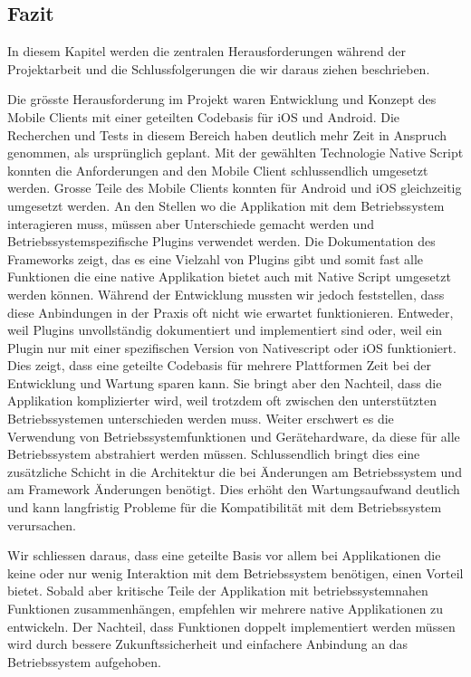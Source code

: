 \subsection{Fazit}

In diesem Kapitel werden die zentralen Herausforderungen während der Projektarbeit und die Schlussfolgerungen die wir daraus ziehen beschrieben.

Die grösste Herausforderung im Projekt waren Entwicklung und Konzept des Mobile Clients mit einer geteilten Codebasis für iOS und Android.
Die Recherchen und Tests in diesem Bereich haben deutlich mehr Zeit in Anspruch genommen, als ursprünglich geplant.
Mit der gewählten Technologie Native Script konnten die Anforderungen and den Mobile Client schlussendlich umgesetzt werden.
Grosse Teile des Mobile Clients konnten für Android und iOS gleichzeitig umgesetzt werden.
An den Stellen wo die Applikation mit dem Betriebssystem interagieren muss, müssen aber Unterschiede gemacht werden und Betriebssystemspezifische Plugins verwendet werden.
Die Dokumentation des Frameworks zeigt, das es eine Vielzahl von Plugins gibt und somit fast alle Funktionen die eine native Applikation bietet auch mit Native Script umgesetzt werden können.
Während der Entwicklung mussten wir jedoch feststellen, dass diese Anbindungen in der Praxis oft nicht wie erwartet funktionieren.
Entweder, weil Plugins unvollständig dokumentiert und implementiert sind oder, weil ein Plugin nur mit einer spezifischen Version von Nativescript oder iOS funktioniert.
Dies zeigt, dass eine geteilte Codebasis für mehrere Plattformen Zeit bei der Entwicklung und Wartung sparen kann.
Sie bringt aber den Nachteil, dass die Applikation komplizierter wird, weil trotzdem oft zwischen den unterstützten Betriebssystemen unterschieden werden muss.
Weiter erschwert es die Verwendung von Betriebssystemfunktionen und Gerätehardware, da diese für alle Betriebssystem abstrahiert werden müssen.
Schlussendlich bringt dies eine zusätzliche Schicht in die Architektur die bei Änderungen am Betriebssystem und am Framework Änderungen benötigt.
Dies erhöht den Wartungsaufwand deutlich und kann langfristig Probleme für die Kompatibilität mit dem Betriebssystem verursachen.

Wir schliessen daraus, dass eine geteilte Basis vor allem bei Applikationen die keine oder nur wenig Interaktion mit dem Betriebssystem benötigen, einen Vorteil bietet.
Sobald aber kritische Teile der Applikation mit betriebssystemnahen Funktionen zusammenhängen, empfehlen wir mehrere native Applikationen zu entwickeln.
Der Nachteil, dass Funktionen doppelt implementiert werden müssen wird durch bessere Zukunftssicherheit und einfachere Anbindung an das Betriebssystem aufgehoben.

